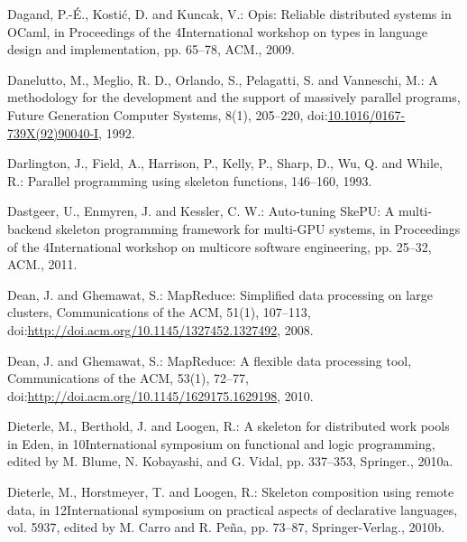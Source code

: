 \documentclass[paper=A4,twoside=true,openright,parskip=full,chapterprefix=true,headings=normal,bibliography=totoc,listof=totoc,titlepage=on,captions=tableabove,draft=false,british]{scrreprt}%
\begin{document}
\leavevmode\hypertarget{ref-Dagand:2009:ORD:1481861.1481870}{}%
Dagand, P.-É., Kostić, D. and Kuncak, V.: Opis: Reliable distributed
systems in OCaml, in Proceedings of the 4International workshop on types
in language design and implementation, pp. 65--78, ACM., 2009.

\leavevmode\hypertarget{ref-DANELUTTO1992205}{}%
Danelutto, M., Meglio, R. D., Orlando, S., Pelagatti, S. and Vanneschi,
M.: A methodology for the development and the support of massively
parallel programs, Future Generation Computer Systems, 8(1), 205--220,
doi:\href{https://doi.org/10.1016/0167-739X(92)90040-I}{10.1016/0167-739X(92)90040-I},
1992.

\leavevmode\hypertarget{ref-darlington1993parallel}{}%
Darlington, J., Field, A., Harrison, P., Kelly, P., Sharp, D., Wu, Q.
and While, R.: Parallel programming using skeleton functions, 146--160,
1993.

\leavevmode\hypertarget{ref-Dastgeer:2011:ASM:1984693.1984697}{}%
Dastgeer, U., Enmyren, J. and Kessler, C. W.: Auto-tuning SkePU: A
multi-backend skeleton programming framework for multi-GPU systems, in
Proceedings of the 4International workshop on multicore software
engineering, pp. 25--32, ACM., 2011.

\leavevmode\hypertarget{ref-Dean:2008:MSD:1327452.1327492}{}%
Dean, J. and Ghemawat, S.: MapReduce: Simplified data processing on
large clusters, Communications of the ACM, 51(1), 107--113,\\
doi:\href{https://doi.org/http://doi.acm.org/10.1145/1327452.1327492}{http://doi.acm.org/10.1145/1327452.1327492},
2008.

\leavevmode\hypertarget{ref-Dean:2010:MFD:1629175.1629198}{}%
Dean, J. and Ghemawat, S.: MapReduce: A flexible data processing tool,
Communications of the ACM, 53(1), 72--77,
doi:\href{https://doi.org/http://doi.acm.org/10.1145/1629175.1629198}{http://doi.acm.org/10.1145/1629175.1629198},
2010.

\leavevmode\hypertarget{ref-dieterle2010skeleton}{}%
Dieterle, M., Berthold, J. and Loogen, R.: A skeleton for distributed
work pools in Eden, in 10International symposium on functional and logic
programming, edited by M. Blume, N. Kobayashi, and G. Vidal, pp.
337--353, Springer., 2010a.

\leavevmode\hypertarget{ref-Dieterle2010}{}%
Dieterle, M., Horstmeyer, T. and Loogen, R.: Skeleton composition using
remote data, in 12International symposium on practical aspects of
declarative languages, vol. 5937, edited by M. Carro and R. Peña, pp.
73--87, Springer-Verlag., 2010b.
\end{document}
